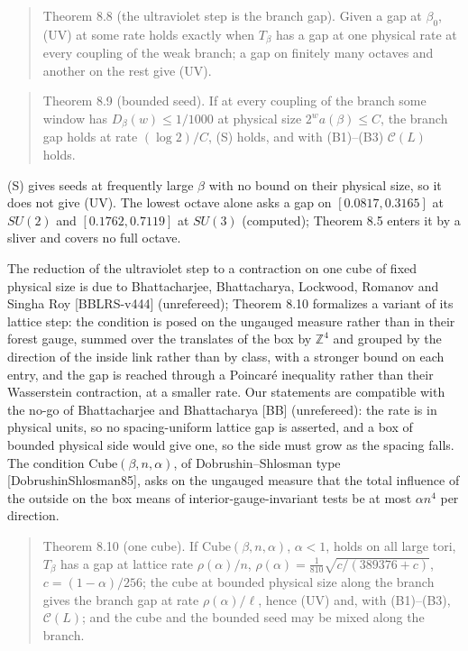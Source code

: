 \documentclass[10pt,letterpaper,twocolumn]{article}
\begin{document}
\begin{quote}
Theorem 8.8 (the ultraviolet step is the branch gap). Given a gap at \(\beta_0\), (UV) at some rate holds exactly when \(T_\beta\) has a gap at one physical rate at every coupling of the weak branch; a gap on finitely many octaves and another on the rest give (UV).
\end{quote}

\begin{quote}
Theorem 8.9 (bounded seed). If at every coupling of the branch some window has \(D_\beta(w)\le1/1000\) at physical size \(2^wa(\beta)\le C\), the branch gap holds at rate \((\log2)/C\), (S) holds, and with (B1)--(B3) \(\mathcal C(L)\) holds.
\end{quote}

(S) gives seeds at frequently large \(\beta\) with no bound on their physical size, so it does not give (UV). The lowest octave alone asks a gap on \([0.0817,0.3165]\) at \(SU(2)\) and \([0.1762,0.7119]\) at \(SU(3)\) (computed); Theorem 8.5 enters it by a sliver and covers no full octave.

The reduction of the ultraviolet step to a contraction on one cube of fixed physical size is due to Bhattacharjee, Bhattacharya, Lockwood, Romanov and Singha Roy {[}BBLRS-v444{]} (unrefereed); Theorem 8.10 formalizes a variant of its lattice step: the condition is posed on the ungauged measure rather than in their forest gauge, summed over the translates of the box by \(\mathbb Z^4\) and grouped by the direction of the inside link rather than by class, with a stronger bound on each entry, and the gap is reached through a Poincaré inequality rather than their Wasserstein contraction, at a smaller rate. Our statements are compatible with the no-go of Bhattacharjee and Bhattacharya {[}BB{]} (unrefereed): the rate is in physical units, so no spacing-uniform lattice gap is asserted, and a box of bounded physical side would give one, so the side must grow as the spacing falls. The condition \(\mathrm{Cube}(\beta,n,\alpha)\), of Dobrushin--Shlosman type {[}DobrushinShlosman85{]}, asks on the ungauged measure that the total influence of the outside on the box means of interior-gauge-invariant tests be at most \(\alpha n^4\) per direction.

\begin{quote}
Theorem 8.10 (one cube). If \(\mathrm{Cube}(\beta,n,\alpha)\), \(\alpha<1\), holds on all large tori, \(T_\beta\) has a gap at lattice rate \(\rho(\alpha)/n\), \(\rho(\alpha)=\tfrac1{810}\sqrt{c/(389376+c)}\), \(c=(1-\alpha)/256\); the cube at bounded physical size along the branch gives the branch gap at rate \(\rho(\alpha)/\ell\), hence (UV) and, with (B1)--(B3), \(\mathcal C(L)\); and the cube and the bounded seed may be mixed along the branch.
\end{quote}
\end{document}
